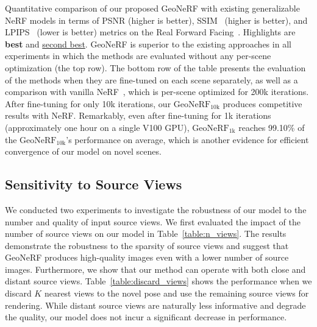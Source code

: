 \begin{table}[!t]
    \caption{Quantitative comparison of our proposed GeoNeRF with existing generalizable NeRF models in terms of PSNR (higher is better), SSIM~\citep{wang2004image} (higher is better), and LPIPS~\citep{zhang2018unreasonable} (lower is better) metrics on the Real Forward Facing~\citep{mildenhall2019llff}. Highlights are \textbf{best} and \underline{second best}. GeoNeRF is superior to the existing approaches in all experiments in which the methods are evaluated without any per-scene optimization (the top row). The bottom row of the table presents the evaluation of the methods when they are fine-tuned on each scene separately, as well as a comparison with vanilla NeRF~\citep{mildenhall2020nerf}, which is per-scene optimized for 200k iterations. After fine-tuning for only 10k iterations, our $\text{GeoNeRF}_{\text{10k}}$ produces competitive results with NeRF. Remarkably, even after fine-tuning for 1k iterations (approximately one hour on a single V100 GPU), $\text{GeoNeRF}_{\text{1k}}$ reaches 99.10\% of the $\text{GeoNeRF}_{\text{10k}}$'s performance on average, which is another evidence for efficient convergence of our model on novel scenes.}
    \label{table:quantitative_llff}
\end{table}

\subsection{Sensitivity to Source Views} \label{sec:c3_sensitivity}
We conducted two experiments to investigate the robustness of our model to the number and quality of input source views. We first evaluated the impact of the number of source views on our model in Table~\ref{table:n_views}. The results demonstrate the robustness to the sparsity of source views and suggest that GeoNeRF produces high-quality images even with a lower number of source images. Furthermore, we show that our method can operate with both close and distant source views. Table~\ref{table:discard_views} shows the performance when we discard $K$ nearest views to the novel pose and use the remaining source views for rendering. While distant source views are naturally less informative and degrade the quality, our model does not incur a significant decrease in performance.

